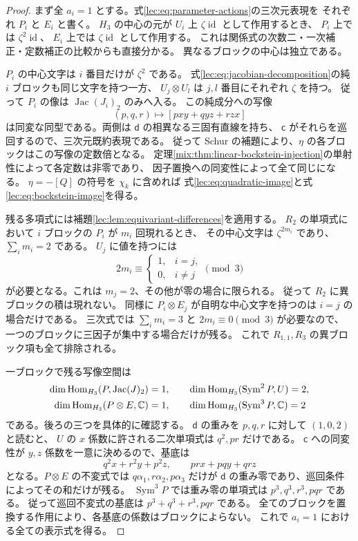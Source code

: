 \begin{proof}
まず全 $a_i=1$ とする。式\eqref{lec:eq:parameter-actions}の三次元表現を
それぞれ $P_i$ と $E_i$ と書く。
$H_3$ の中心の元が $U_i$ 上 $\zeta\operatorname{id}$ として作用するとき、
$P_i$ 上では $\zeta^2\operatorname{id}$、
$E_i$ 上では $\zeta\operatorname{id}$ として作用する。
これは関係式の次数二・一次補正・定数補正の比較からも直接分かる。
異なるブロックの中心は独立である。

$P_i$ の中心文字は $i$ 番目だけが $\zeta^2$ である。
式\eqref{lec:eq:jacobian-decomposition}の純 $i$ ブロックも同じ文字を持つ一方、
$U_j\otimes U_l$ は $j,l$ 番目にそれぞれ $\zeta$ を持つ。
従って $P_i$ の像は $\operatorname{Jac}(J_i)_2$ のみへ入る。
この純成分への写像
\[
              (p,q,r)\longmapsto[pxy+qyz+rzx]
\]
は同変な同型である。両側は $\mathsf d$ の相異なる三固有直線を持ち、
$\mathsf c$ がそれらを巡回するので、三次元既約表現である。
従って Schur の補題により、$\eta$ の各ブロックはこの写像の定数倍となる。
定理\ref{mix:thm:linear-bockstein-injection}の単射性によって各定数は非零であり、
因子置換への同変性によって全て同じになる。
$\eta=-[Q]$ の符号を $\chi_k$ に含めれば
式\eqref{lec:eq:quadratic-image}と式\eqref{lec:eq:bockstein-image}を得る。

残る多項式には補題\ref{lec:lem:equivariant-differences}を適用する。
$R_2$ の単項式において $i$ ブロックの $P_i$ が $m_i$ 回現れるとき、
その中心文字は $\zeta^{2m_i}$ であり、$\sum_i m_i=2$ である。
$U_j$ に値を持つには
\[
             2m_i\equiv\begin{cases}1,&i=j,\\0,&i\ne j\end{cases}
                        \pmod3
\]
が必要となる。これは $m_j=2$、その他が零の場合に限られる。
従って $R_2$ に異ブロックの積は現れない。
同様に $P_i\otimes E_j$ が自明な中心文字を持つのは $i=j$ の場合だけである。
三次式では $\sum_i m_i=3$ と $2m_i\equiv0\pmod3$ が必要なので、
一つのブロックに三因子が集中する場合だけが残る。
これで $R_{1,1},R_3$ の異ブロック項も全て排除される。

一ブロックで残る写像空間は
\begin{align*}
 \dim\operatorname{Hom}_{H_3}(P,\operatorname{Jac}(J)_2)&=1,\qquad
 \dim\operatorname{Hom}_{H_3}(\operatorname{Sym}^2P,U)=2,\\
 \dim\operatorname{Hom}_{H_3}(P\otimes E,\mathbb C)&=1,\qquad
 \dim\operatorname{Hom}_{H_3}(\operatorname{Sym}^3P,\mathbb C)=2
\end{align*}
である。後ろの三つを具体的に確認する。
$\mathsf d$ の重みを $p,q,r$ に対して $(1,0,2)$ と読むと、
$U$ の $x$ 係数に許される二次単項式は $q^2,pr$ だけである。
$\mathsf c$ への同変性が $y,z$ 係数を一意に決めるので、基底は
\[
       q^2x+r^2y+p^2z,\qquad prx+pqy+qrz
\]
となる。$P\otimes E$ の不変式では $q\alpha_1,r\alpha_2,p\alpha_3$ だけが
$\mathsf d$ の重み零であり、巡回条件によってその和だけが残る。
$\operatorname{Sym}^3P$ では重み零の単項式は
$p^3,q^3,r^3,pqr$ である。
従って巡回不変式の基底は $p^3+q^3+r^3,pqr$ である。
全てのブロックを置換する作用により、各基底の係数はブロックによらない。
これで $a_i=1$ における全ての表示式を得る。


\end{proof}
